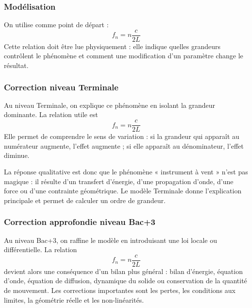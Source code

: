 \documentclass[11pt,a4paper]{article}
\begin{document}
\subsubsection*{Modélisation}

\begin{theorembox}
On utilise comme point de départ :
\[
f_n=n\frac{c}{2L}
\]
Cette relation doit être lue physiquement : elle indique quelles grandeurs contrôlent le phénomène et comment une modification d'un paramètre change le résultat.
\end{theorembox}

\subsubsection*{Correction niveau Terminale}

\begin{corrigebox}

Au niveau Terminale, on explique ce phénomène en isolant la grandeur dominante. La relation utile est
\[
f_n=n\frac{c}{2L}
\]
Elle permet de comprendre le sens de variation : si la grandeur qui apparaît au numérateur augmente, l'effet augmente ; si elle apparaît au dénominateur, l'effet diminue.

La réponse qualitative est donc que le phénomène « instrument à vent » n'est pas magique : il résulte d'un transfert d'énergie, d'une propagation d'onde, d'une force ou d'une contrainte géométrique. Le modèle Terminale donne l'explication principale et permet de calculer un ordre de grandeur.

\end{corrigebox}

\subsubsection*{Correction approfondie niveau Bac+3}

\begin{approfondissementbox}

Au niveau Bac+3, on raffine le modèle en introduisant une loi locale ou différentielle. La relation
\[
f_n=n\frac{c}{2L}
\]
devient alors une conséquence d'un bilan plus général : bilan d'énergie, équation d'onde, équation de diffusion, dynamique du solide ou conservation de la quantité de mouvement. Les corrections importantes sont les pertes, les conditions aux limites, la géométrie réelle et les non-linéarités.

\end{approfondissementbox}
\end{document}
